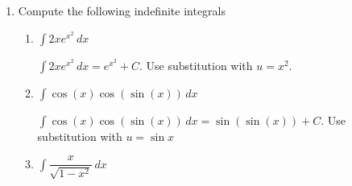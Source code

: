 \documentclass{article}
\begin{document}
\begin{enumerate}
\begin{framed}
\begin{itemize}
\begin{multicols}{2}
$\displaystyle \int \cos(u)\,du\ =$
\solonly{\textcolor{red}{$\sin u+C$}}
\newline

$\displaystyle \int u^n\,du\ =$
\newline

$\displaystyle \int \sin(u)\,du\ =$
\solonly{\textcolor{red}{$-\cos u +C$}}
\newline

$\displaystyle \int \sec^2(u)\,du\ =$
\solonly{\textcolor{red}{$\tan u +C$}}
\newline

$\displaystyle \int \sec(u) \tan(u)\,du\ =$
\solonly{\textcolor{red}{$\sec u +C$}}
\newline 

$\displaystyle \int \dfrac{1}{u}\,du\ =$
\solonly{\textcolor{red}{$\ln |u| +C$}}
\newline
\newline
\newline

\end{multicols}

\end{itemize}
\end{framed}

\item Compute the following indefinite integrals
    
    \begin{enumerate}
        \item $\displaystyle \int 2x e^{x^2}\,dx$
        
        \begin{solution}
          $\displaystyle \int 2x e^{x^2}\,dx =e^{x^2} + C$. Use substitution with $u=x^2$.
        \end{solution}
        \probonly{\vfill}
        
        \item $\displaystyle \int \cos(x) \cos(\sin(x))\,dx$
        
        \begin{solution}
          $\displaystyle \int \cos(x) \cos(\sin(x))\,dx = \sin(\sin(x)) + C$. Use substitution with $u=\sin x$
        \end{solution}
        \probonly{\vfill}
        
        \item $\displaystyle \int \dfrac{x}{\sqrt{1-x^2}}\,dx$
        

\end{enumerate}
\end{enumerate}
\end{document}
